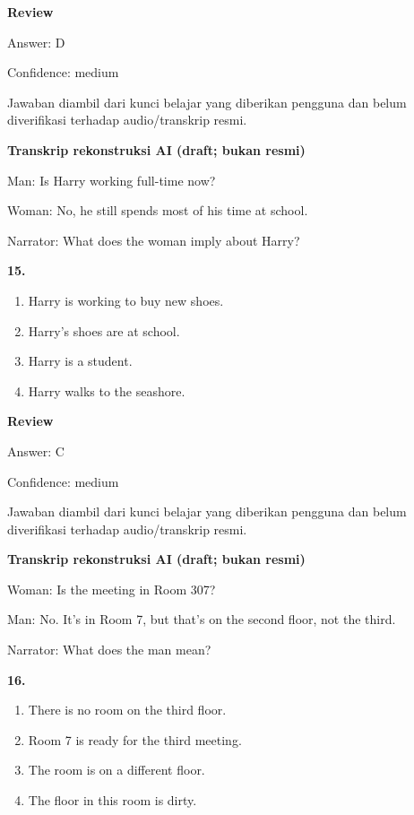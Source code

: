 \documentclass[12pt]{article}
\begin{document}
\setlength{\parindent}{0pt}
\textbf{Review}\par
Answer: D\par
Confidence: medium\par
Jawaban diambil dari kunci belajar yang diberikan pengguna dan belum diverifikasi terhadap audio/transkrip resmi.\par
\endgroup
\par
\vspace{0.25\baselineskip}
\begin{exampleblock}
\textbf{Transkrip rekonstruksi AI (draft; bukan resmi)}\par
Man: Is Harry working full-time now?\par
Woman: No, he still spends most of his time at school.\par
Narrator: What does the woman imply about Harry?\par
\end{exampleblock}
\noindent\textbf{15.}
\begin{enumerate}[label=(\Alph*),leftmargin=*,itemsep=0.2em]
\item Harry is working to buy new shoes.
\item Harry's shoes are at school.
\item Harry is a student.
\item Harry walks to the seashore.
\end{enumerate}
\par
\begingroup
\setlength{\parskip}{0pt}
\setlength{\parindent}{0pt}
\textbf{Review}\par
Answer: C\par
Confidence: medium\par
Jawaban diambil dari kunci belajar yang diberikan pengguna dan belum diverifikasi terhadap audio/transkrip resmi.\par
\endgroup
\par
\vspace{0.25\baselineskip}
\begin{exampleblock}
\textbf{Transkrip rekonstruksi AI (draft; bukan resmi)}\par
Woman: Is the meeting in Room 307?\par
Man: No. It's in Room 7, but that's on the second floor, not the third.\par
Narrator: What does the man mean?\par
\end{exampleblock}
\noindent\textbf{16.}
\begin{enumerate}[label=(\Alph*),leftmargin=*,itemsep=0.2em]
\item There is no room on the third floor.
\item Room 7 is ready for the third meeting.
\item The room is on a different floor.
\item The floor in this room is dirty.
\end{enumerate}
\end{document}
